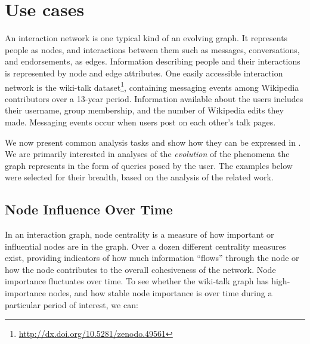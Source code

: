 \section{Use cases}
\label{sec:usecases}


An interaction network is one typical kind of an evolving graph.  It
represents people as nodes, and interactions between them such as
messages, conversations, and endorsements, as edges.  Information
describing people and their interactions is represented by node and
edge attributes.  One easily accessible interaction network is the
wiki-talk
dataset\footnote{\url{http://dx.doi.org/10.5281/zenodo.49561}},
containing messaging events among Wikipedia contributors over a
13-year period.  Information available about the users includes their
username, group membership, and the number of Wikipedia edits they
made.  Messaging events occur when users post on each other's talk
pages.

We now present common analysis tasks and show how they can be
expressed in \tga. We are primarily interested in analyses of the {\em
  evolution} of the phenomena the graph represents in the form of
queries posed by the user.  The examples below were selected for their
breadth, based on the analysis of the related work.

\subsection{Node Influence Over Time}

In an interaction graph, node centrality is a measure of how important
or influential nodes are in the graph.  Over a dozen different
centrality measures exist, providing indicators of how much
information ``flows'' through the node or how the node contributes
to the overall cohesiveness of the network.  Node importance
fluctuates over time.  To see whether the wiki-talk graph has
high-importance nodes, and how stable node importance is over
time during a particular period of interest, we can:

